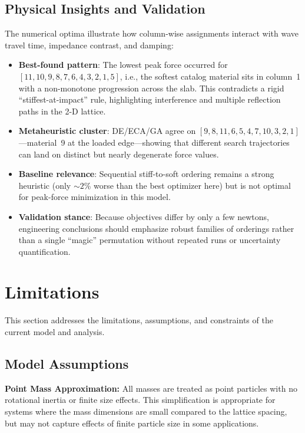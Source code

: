 \documentclass[11pt,a4paper]{article}
\begin{document}
\subsection{Physical Insights and Validation}

\noindent The numerical optima illustrate how column-wise assignments interact with wave travel time, impedance contrast, and damping:

\begin{itemize}
    \item \textbf{Best-found pattern}: The lowest peak force occurred for $[11, 10, 9, 8, 7, 6, 4, 3, 2, 1, 5]$, i.e., the softest catalog material sits in column~1 with a non-monotone progression across the slab. This contradicts a rigid ``stiffest-at-impact'' rule, highlighting interference and multiple reflection paths in the 2-D lattice.
    \item \textbf{Metaheuristic cluster}: DE/ECA/GA agree on $[9, 8, 11, 6, 5, 4, 7, 10, 3, 2, 1]$---material~9 at the loaded edge---showing that different search trajectories can land on distinct but nearly degenerate force values.
    \item \textbf{Baseline relevance}: Sequential stiff-to-soft ordering remains a strong heuristic (only $\sim 2$\% worse than the best optimizer here) but is not optimal for peak-force minimization in this model.
    \item \textbf{Validation stance}: Because objectives differ by only a few newtons, engineering conclusions should emphasize robust families of orderings rather than a single ``magic'' permutation without repeated runs or uncertainty quantification.
\end{itemize}

\section{Limitations}
\label{sec:limitations}

\noindent This section addresses the limitations, assumptions, and constraints of the current model and analysis.

\subsection{Model Assumptions}

\noindent \textbf{Point Mass Approximation:} All masses are treated as point particles with no rotational inertia or finite size effects. This simplification is appropriate for systems where the mass dimensions are small compared to the lattice spacing, but may not capture effects of finite particle size in some applications. \newline
\end{document}
